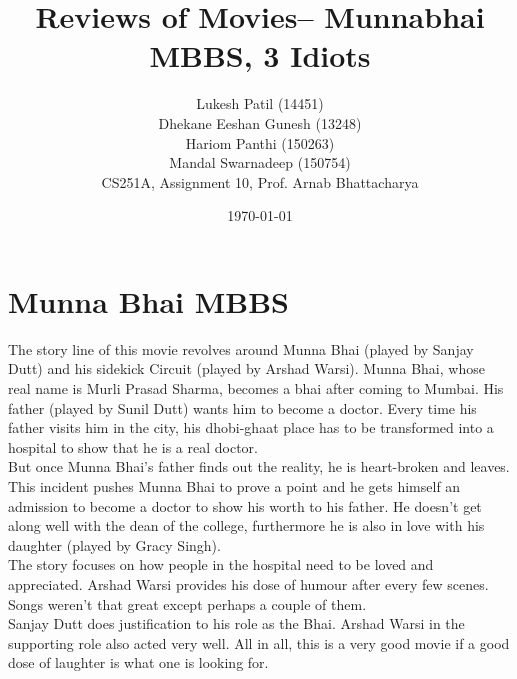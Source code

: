 \documentclass{article}
\author{Lukesh Patil (14451)\\ Dhekane Eeshan Gunesh (13248)\\ Hariom Panthi (150263)\\ Mandal Swarnadeep (150754)\\CS251A, Assignment 10, Prof. Arnab Bhattacharya}
\title{Reviews of Movies-- Munnabhai MBBS, 3 Idiots}
\date{\today}
\begin{document}
\maketitle

\section{Munna Bhai MBBS}
The story line of this movie revolves around Munna Bhai (played by Sanjay Dutt) and his sidekick Circuit (played by Arshad Warsi). Munna Bhai, whose real name is Murli Prasad Sharma, becomes a bhai after coming to Mumbai. His father (played by Sunil Dutt) wants him to become a doctor. Every time his father visits him in the city, his dhobi-ghaat place has to be transformed into a hospital to show that he is a real doctor. \\ 
But once Munna Bhai's father finds out the reality, he is heart-broken and leaves. This incident pushes Munna Bhai to prove a point and he gets himself an admission to become a doctor to show his worth to his father. He doesn't get along well with the dean of the college, furthermore he is also in love with his daughter (played by Gracy Singh). \\ 
The story focuses on how people in the hospital need to be loved and appreciated. Arshad Warsi provides his dose of humour after every few scenes. Songs weren't that great except perhaps a couple of them. \\ 
Sanjay Dutt does justification to his role as the Bhai. Arshad Warsi in the supporting role also acted very well. All in all, this is a very good movie if a good dose of laughter is what one is looking for.
\end{document}
